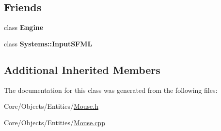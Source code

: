 \subsection*{Friends}
\begin{DoxyCompactItemize}
\item 
\hypertarget{classDCEngine_1_1Mouse_a3e1914489e4bed4f9f23cdeab34a43dc}{class {\bfseries Engine}}\label{classDCEngine_1_1Mouse_a3e1914489e4bed4f9f23cdeab34a43dc}

\item 
\hypertarget{classDCEngine_1_1Mouse_a4e4db07dae7df718d000df5cdd678463}{class {\bfseries Systems\-::\-Input\-S\-F\-M\-L}}\label{classDCEngine_1_1Mouse_a4e4db07dae7df718d000df5cdd678463}

\end{DoxyCompactItemize}
\subsection*{Additional Inherited Members}


The documentation for this class was generated from the following files\-:\begin{DoxyCompactItemize}
\item 
Core/\-Objects/\-Entities/\hyperlink{Mouse_8h}{Mouse.\-h}\item 
Core/\-Objects/\-Entities/\hyperlink{Mouse_8cpp}{Mouse.\-cpp}\end{DoxyCompactItemize}
